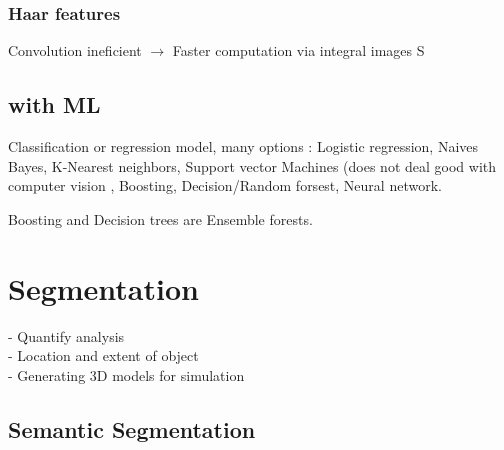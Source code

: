 
	\subsubsection{Haar features} %
	\label{sub:haar_features}
	
	Convolution ineficient $\rightarrow$ Faster computation via integral images S
	
	\subsection{with ML} %
	\label{sub:with_ml}
	

		Classification or regression model, many options : Logistic regression, Naives Bayes, K-Nearest neighbors, Support vector Machines (does not deal good with computer vision , Boosting, Decision/Random forsest, Neural network.

		Boosting and Decision trees are Ensemble forests. 


	\section{Segmentation}

	 	- Quantify analysis\\
	 	- Location and extent of object\\
	 	- Generating 3D models for simulation\\


		\subsection{Semantic Segmentation}



